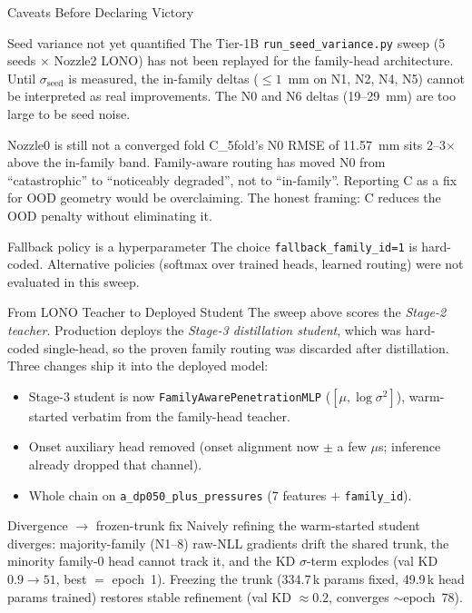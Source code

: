 \documentclass[UTF8,aspectratio=169]{ctexbeamer}
\newcommand{\good}[1]{\textcolor{green!45!black}{#1}}
\newcommand{\warn}[1]{\textcolor{red!65!black}{#1}}
\begin{document}
\begin{frame}{Caveats Before Declaring Victory}
\small
\begin{block}{Seed variance not yet quantified}
The Tier-1B \texttt{run\_seed\_variance.py} sweep (5 seeds $\times$ Nozzle2 LONO)
has not been replayed for the family-head architecture. Until $\sigma_{\text{seed}}$
is measured, the in-family deltas ($\leq 1$~mm on N1, N2, N4, N5) cannot be
interpreted as real improvements. The N0 and N6 deltas (19--29~mm) are too large
to be seed noise.
\end{block}

\begin{block}{Nozzle0 is still not a converged fold}
C\_5fold's N0 RMSE of 11.57~mm sits 2--3$\times$ above the in-family band.
Family-aware routing has moved N0 from ``catastrophic'' to ``noticeably degraded'',
not to ``in-family''. Reporting C as a fix for OOD geometry would be overclaiming.
The honest framing: C reduces the OOD penalty without eliminating it.
\end{block}

\begin{block}{Fallback policy is a hyperparameter}
The choice \texttt{fallback\_family\_id=1} is hard-coded. Alternative policies
(softmax over trained heads, learned routing) were not evaluated in this sweep.
\end{block}
\end{frame}

\begin{frame}{From LONO Teacher to Deployed Student}
\small
The sweep above scores the \emph{Stage-2 teacher}. Production deploys the
\emph{Stage-3 distillation student}, which was hard-coded single-head, so the
proven family routing was \warn{discarded after distillation}. Three changes ship
it into the deployed model:
\begin{itemize}\setlength\itemsep{2pt}
  \item Stage-3 student is now \texttt{FamilyAwarePenetrationMLP} ($[\mu,\log\sigma^2]$),
        warm-started verbatim from the family-head teacher.
  \item Onset auxiliary head removed (onset alignment now $\pm$ a few $\mu$s;
        inference already dropped that channel).
  \item Whole chain on \texttt{a\_dp050\_plus\_pressures} (7 features $+$ \texttt{family\_id}).
\end{itemize}

\begin{block}{Divergence $\to$ frozen-trunk fix}
Naively refining the warm-started student \warn{diverges}: majority-family
(N1--8) raw-NLL gradients drift the shared trunk, the minority family-0 head
cannot track it, and the KD $\sigma$-term explodes
(val KD $0.9\!\to\!51$, best $=$ epoch~1). \good{Freezing the trunk}
(334.7\,k params fixed, 49.9\,k head params trained) restores stable refinement
(val KD $\approx 0.2$, converges $\sim$epoch~78).
\end{block}
\end{frame}
\end{document}
